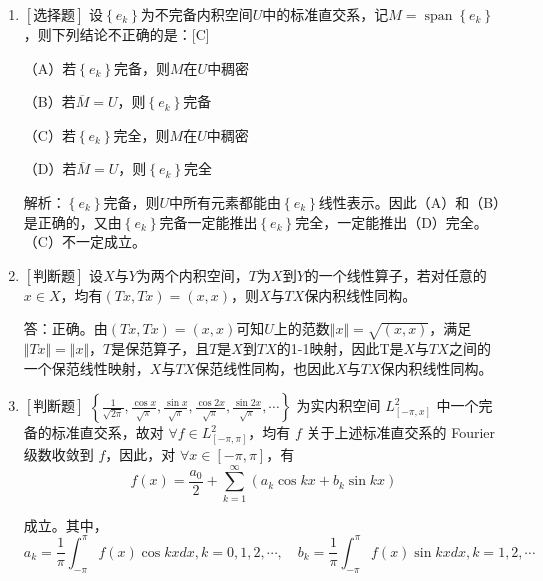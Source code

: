 \documentclass{article}
\begin{document}
\begin{enumerate}
    \item $\left[\textbf{选择题}\right]$ 设$\left\{e_k\right\}$为不完备内积空间$U$中的标准直交系，记$M=\mathop{span}\left\{e_k\right\}$，则下列结论不正确的是：\hfill [C]
    
        \begin{minipage}[t]{0.45\linewidth}
        （A）若$\left\{e_k\right\}$完备，则$M$在$U$中稠密
        \end{minipage}
        \hfill
        \begin{minipage}[t]{0.45\linewidth}
        （B）若$\overline{M}=U$，则$\left\{e_k\right\}$完备
        \end{minipage}
        \begin{minipage}[t]{0.45\linewidth}
        （C）若$\left\{e_k\right\}$完全，则$M$在$U$中稠密
        \end{minipage}
        \hfill
        \begin{minipage}[t]{0.45\linewidth}
        （D）若$\overline{M}=U$，则$\left\{e_k\right\}$完全
        \end{minipage}

    解析：$\left\{e_k\right\}$完备，则$U$中所有元素都能由$\left\{e_k\right\}$线性表示。因此（A）和（B）是正确的，又由$\left\{e_k\right\}$完备一定能推出$\left\{e_k\right\}$完全，一定能推出（D）完全。（C）不一定成立。
    
    \item $\left[\textbf{判断题}\right]$ 设$X$与$Y$为两个内积空间，$T$为$X$到$Y$的一个线性算子，若对任意的$x\in X$，均有$(Tx, Tx)=(x, x)$，则$X$与$TX$保内积线性同构。

    答：正确。由$(Tx, Tx)=(x, x)$可知$U$上的范数$\Vert x \Vert = \sqrt{(x, x)}$，满足$\Vert Tx \Vert = \Vert x \Vert$，$T$是保范算子，且$T$是$X$到$TX$的1-1映射，因此T是$X$与$TX$之间的一个保范线性映射，$X$与$TX$保范线性同构，也因此$X$与$TX$保内积线性同构。

    \item $\left[\textbf{判断题}\right]$ $\left\{\frac{1}{\sqrt{2 \pi}}, \frac{\cos x}{\sqrt{\pi}}, \frac{\sin x}{\sqrt{\pi}}, \frac{\cos 2 x}{\sqrt{\pi}}, \frac{\sin 2 x}{\sqrt{\pi}}, \cdots\right\}$ 为实内积空间 $L_{[-\pi, x]}^2$ 中一个完备的标准直交系，故对 $\forall f \in L_{[-\pi, \pi]}^2$，均有 $f$ 关于上述标准直交系的 Fourier 级数收敛到 $f$，因此，对 $\forall x \in[-\pi, \pi]$，有
$$
f(x)=\frac{a_0}{2} + \sum_{k=1}^{\infty}\left(a_k \cos k x+b_k \sin k x\right)
$$

成立。其中，
$$
a_k=\frac{1}{\pi} \int_{-\pi}^\pi f(x) \cos k x d x, k=0,1,2, \cdots, \quad b_k=\frac{1}{\pi} \int_{-\pi}^\pi f(x) \sin k x d x, k=1,2, \cdots
$$


\end{enumerate}
\end{document}
